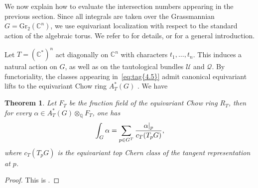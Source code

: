 \documentclass[11pt]{article}
\numberwithin{equation}{section}
\numberwithin{figure}{section}
\theoremstyle{plain}
\newtheorem{thm}{Theorem}[section]
\theoremstyle{definition}
\theoremstyle{remark}
\newcommand{\Gr}{\mathrm{Gr}}
\begin{document}
We now explain how to evaluate the intersection numbers appearing in the
previous section.
Since all integrals are taken over the Grassmannian
$G=\Gr_2(\mathbb C^n)$, we use equivariant localization with respect to the
standard action of the algebraic torus. We refer to \cite{EG982} for details, or \cite{EG98} for a general introduction.

Let $T=(\mathbb C^\ast)^n$ act diagonally on $\mathbb C^n$ with characters
$t_1,\dots,t_n$.
This induces a natural action on $G$, as well as on the tautological
bundles $\mathcal U$ and $\mathcal Q$.
By functoriality, the classes appearing in~\eqref{eq:tag{4.5}} admit canonical equivariant
lifts to the equivariant Chow ring $A_T^\ast(G)$ \cite[Section 2.4]{EG98}. 
We have
\begin{thm}
    Let $F_T$ be the fraction field of the equivariant Chow ring $R_T$, then for every $\alpha \in A_T^\ast(G) \otimes_{\mathbb{Q}} F_T$, one has
\begin{equation}\label{eq:tag{4.6}}
\int_{G} \alpha = \sum_{p \in G^T}
\frac{\alpha|_p}{c_T(T_p G)},
\end{equation}
where $c_T(T_p G)$ is the equivariant top Chern class of the tangent representation at $p$.
\end{thm}

\begin{proof}
  This is \cite[Section 4, Theorem 2 and Corollary 1]{EG982}.
\end{proof}
\end{document}
